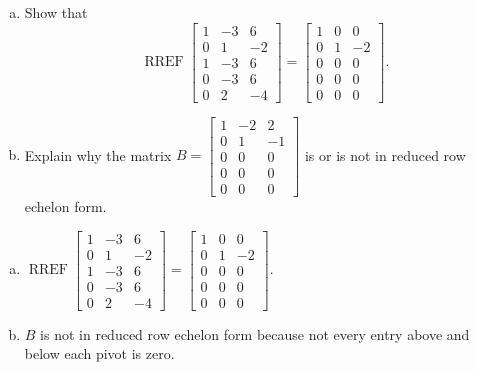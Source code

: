 
\begin{exerciseStatement}

\begin{enumerate}[(a)]
\item Show that \[\operatorname{RREF} \left[\begin{array}{ccc}
1 & -3 & 6 \\
0 & 1 & -2 \\
1 & -3 & 6 \\
0 & -3 & 6 \\
0 & 2 & -4
\end{array}\right] = \left[\begin{array}{ccc}
1 & 0 & 0 \\
0 & 1 & -2 \\
0 & 0 & 0 \\
0 & 0 & 0 \\
0 & 0 & 0
\end{array}\right] .\]
\item Explain why the matrix \(B= \left[\begin{array}{ccc}
1 & -2 & 2 \\
0 & 1 & -1 \\
0 & 0 & 0 \\
0 & 0 & 0 \\
0 & 0 & 0
\end{array}\right] \) is or is not in reduced row echelon form.
\end{enumerate}
    
\end{exerciseStatement}
    
\begin{exerciseAnswer} 

\begin{enumerate}[(a)]
\item \(\operatorname{RREF} \left[\begin{array}{ccc}
1 & -3 & 6 \\
0 & 1 & -2 \\
1 & -3 & 6 \\
0 & -3 & 6 \\
0 & 2 & -4
\end{array}\right] = \left[\begin{array}{ccc}
1 & 0 & 0 \\
0 & 1 & -2 \\
0 & 0 & 0 \\
0 & 0 & 0 \\
0 & 0 & 0
\end{array}\right] .\)
\item \(B\) is not in reduced row echelon form because not every entry above and below each pivot is zero. 
\end{enumerate}
    
\end{exerciseAnswer}
    

